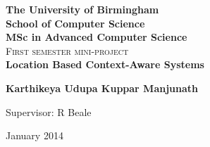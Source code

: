 \documentclass[12pt]{report}
\begin{document}
\begin{titlepage}
\begin{center}

\textbf{\LARGE The University of Birmingham}\\[0.35cm]
\textbf{\LARGE School of Computer Science}\\[0.35cm]
\textbf{\LARGE MSc in Advanced Computer Science}\\[2.5cm]

\textsc{\Large First semester mini-project}\\[2.5cm]


{ \huge \bfseries Location Based Context-Aware Systems \\[1cm] }

{\large \textbf{Karthikeya Udupa Kuppar Manjunath}\\[1cm]}

\large{Supervisor: R Beale}


\vfill

{\large January 2014}

\end{center}
\end{titlepage}
\end{document}
